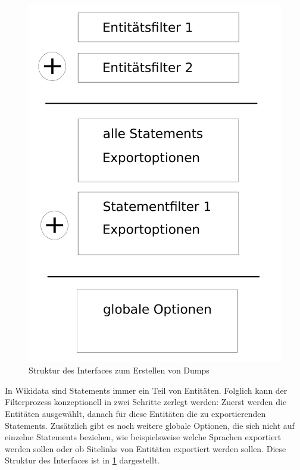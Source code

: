 \begin{figure}
  \includegraphics[width=\textwidth]{pics/ui-layout}
  \caption{Struktur des Interfaces zum Erstellen von Dumps}
  \label{fig:ui-layout}
\end{figure}

In Wikidata sind Statements immer ein Teil von Entitäten.
Folglich kann der Filterprozess konzeptionell in zwei Schritte zerlegt werden: Zuerst werden die Entitäten ausgewählt, danach für diese Entitäten die zu exportierenden Statements.
Zusätzlich gibt es noch weitere globale Optionen, die sich nicht auf einzelne Statements beziehen, wie beispielsweise welche Sprachen exportiert werden sollen oder ob Sitelinks von Entitäten exportiert werden sollen.
Diese Struktur des Interfaces ist in \cref{fig:ui-layout} dargestellt.

